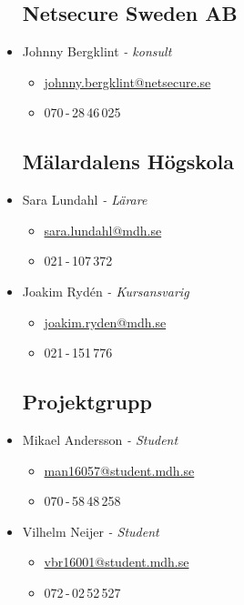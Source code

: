\begin{itemize}
    \setlength\itemsep{0em}
    \subsection*{Netsecure Sweden AB}
        \item Johnny Bergklint \textit{- konsult}
            \begin{itemize}
                \item \href{mailto:johnny.bergklint@netsecure.se}{johnny.bergklint@netsecure.se}
                \item 070\,-\,28\,46\,025
            \end{itemize}

    \subsection*{Mälardalens Högskola}
        \item Sara Lundahl \textit{- Lärare}
            \begin{itemize}
                \item \href{mailto:sara.lundahl@mdh.se}{sara.lundahl@mdh.se}
                \item 021\,-\,107\,372
            \end{itemize}

        \item Joakim Rydén \textit{- Kursansvarig}
            \begin{itemize}
                \item \href{mailto:joakim.ryden@mdh.se}{joakim.ryden@mdh.se}
                \item 021\,-\,151\,776
            \end{itemize}

    \subsection*{Projektgrupp}
        \item Mikael Andersson \textit{- Student}
            \begin{itemize}
                \item \href{mailto:man16057@student.mdh.se}{man16057@student.mdh.se}
                \item 070\,-\,58\,48\,258
            \end{itemize}

        \item Vilhelm Neijer \textit{- Student}
            \begin{itemize}
                \item \href{mailto:vbr16001@student.mdh.se}{vbr16001@student.mdh.se}
                \item 072\,-\,02\,52\,527
            \end{itemize}


\end{itemize}

